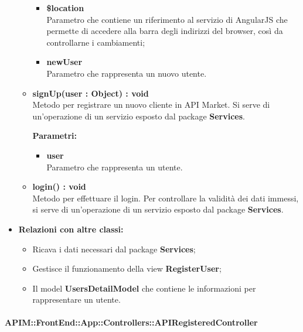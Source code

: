 \begin{itemize}
\begin{itemize}
\begin{itemize}
				\item \textbf{\$location}\\
				Parametro che contiene un riferimento al servizio di AngularJS che permette di accedere alla barra degli indirizzi del browser, così da controllarne i cambiamenti;
				
				\item \textbf{newUser}\\
				Parametro che rappresenta un nuovo utente.
			\end{itemize}
			
			\item \textbf{signUp(user : Object) : void}\\
			Metodo per registrare un nuovo cliente in API Market. Si serve di un'operazione di un servizio esposto dal package \textbf{Services}.
			\begin{description}
    			\item[\textbf{Parametri:}]
			\end{description}
			\begin{itemize}
				\item \textbf{user}\\
				Parametro che rappresenta un utente.
			\end{itemize}
			
			\item \textbf{login() : void}\\
			Metodo per effettuare il login. Per controllare la validità dei dati immessi, si serve di un'operazione di un servizio esposto dal package \textbf{Services}.
			
		\end{itemize}
	\item \textbf{Relazioni con altre classi:}
		\begin{itemize}
			\item Ricava i dati necessari dal package \textbf{Services};
			\item Gestisce il funzionamento della view \textbf{RegisterUser};
			\item Il model \textbf{UsersDetailModel} che contiene le informazioni per rappresentare un utente.
		\end{itemize}
\end{itemize}

\paragraph{APIM::FrontEnd::App::Controllers::APIRegisteredController}

